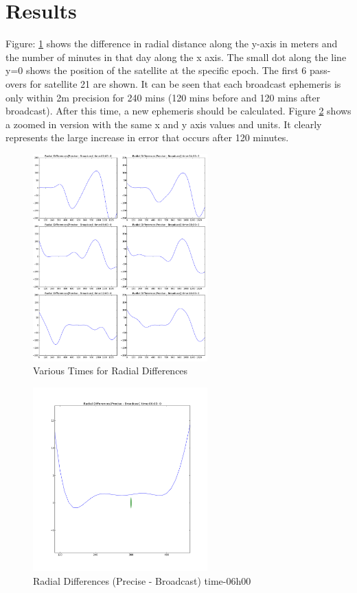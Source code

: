 \section{Results}

Figure: \ref{fig:1} shows the difference in radial distance along the y-axis in meters and the number of minutes in that day along the x axis. The small dot along the line y=0 shows the position of the satellite at the specific epoch. The first 6 pass-overs for satellite 21 are shown. It can be seen that each broadcast ephemeris is only within 2m precision for 240 mins (120 mins before and 120 mins after broadcast). After this time, a new ephemeris should be calculated. Figure \ref{fig:2} shows a zoomed in version with the same x and y axis values and units. It clearly represents the large increase in error that occurs after 120 minutes. 
\begin{figure}[h]
	\centering
	\includegraphics[width=0.6\textwidth]{r1.png}
	\caption{Various Times for Radial Differences}
	\label{fig:1}
\end{figure} 

\begin{figure}[h]
	\centering
	\includegraphics[width=0.6\textwidth]{6.png}
	\caption{Radial Differences (Precise - Broadcast) time-06h00}
	\label{fig:2}
\end{figure} 

